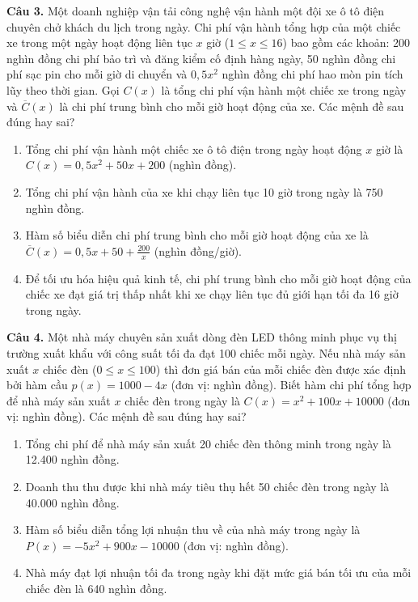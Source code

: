 \documentclass[12pt]{article}
\begin{document}
	\vspace{0.6cm}
	\noindent \textbf{Câu 3.} Một doanh nghiệp vận tải công nghệ vận hành một đội xe ô tô điện chuyên chở khách du lịch trong ngày. Chi phí vận hành tổng hợp của một chiếc xe trong một ngày hoạt động liên tục $x$ giờ ($1 \le x \le 16$) bao gồm các khoản: 200 nghìn đồng chi phí bảo trì và đăng kiểm cố định hàng ngày, 50 nghìn đồng chi phí sạc pin cho mỗi giờ di chuyển và $0,5x^2$ nghìn đồng chi phí hao mòn pin tích lũy theo thời gian. Gọi $C(x)$ là tổng chi phí vận hành một chiếc xe trong ngày và $\overline{C}(x)$ là chi phí trung bình cho mỗi giờ hoạt động của xe. Các mệnh đề sau đúng hay sai?
	\begin{enumerate}[label=\textbf{\alph*)}]
		\item Tổng chi phí vận hành một chiếc xe ô tô điện trong ngày hoạt động $x$ giờ là $C(x) = 0,5x^2 + 50x + 200$ (nghìn đồng). \hfill  
		\item Tổng chi phí vận hành của xe khi chạy liên tục 10 giờ trong ngày là 750 nghìn đồng. \hfill  
		\item Hàm số biểu diễn chi phí trung bình cho mỗi giờ hoạt động của xe là $\overline{C}(x) = 0,5x + 50 + \frac{200}{x}$ (nghìn đồng/giờ). \hfill  
		\item Để tối ưu hóa hiệu quả kinh tế, chi phí trung bình cho mỗi giờ hoạt động của chiếc xe đạt giá trị thấp nhất khi xe chạy liên tục đủ giới hạn tối đa 16 giờ trong ngày. \hfill  
	\end{enumerate}
	
	\noindent \textbf{Câu 4.} Một nhà máy chuyên sản xuất dòng đèn LED thông minh phục vụ thị trường xuất khẩu với công suất tối đa đạt 100 chiếc mỗi ngày. Nếu nhà máy sản xuất $x$ chiếc đèn ($0 \le x \le 100$) thì đơn giá bán của mỗi chiếc đèn được xác định bởi hàm cầu $p(x) = 1000 - 4x$ (đơn vị: nghìn đồng). Biết hàm chi phí tổng hợp để nhà máy sản xuất $x$ chiếc đèn trong ngày là $C(x) = x^2 + 100x + 10000$ (đơn vị: nghìn đồng). Các mệnh đề sau đúng hay sai?
	\begin{enumerate}[label=\textbf{\alph*)}]
		\item Tổng chi phí để nhà máy sản xuất 20 chiếc đèn thông minh trong ngày là 12.400 nghìn đồng. \hfill  
		\item Doanh thu thu được khi nhà máy tiêu thụ hết 50 chiếc đèn trong ngày là 40.000 nghìn đồng. \hfill  
		\item Hàm số biểu diễn tổng lợi nhuận thu về của nhà máy trong ngày là $P(x) = -5x^2 + 900x - 10000$ (đơn vị: nghìn đồng). \hfill  
		\item Nhà máy đạt lợi nhuận tối đa trong ngày khi đặt mức giá bán tối ưu của mỗi chiếc đèn là 640 nghìn đồng. \hfill  
	\end{enumerate}
	
\end{document}
